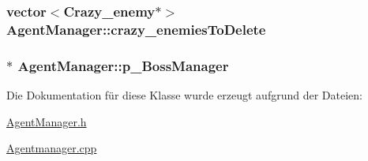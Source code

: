 \hypertarget{class_agent_manager_ad04668952fb54954caf87f088eedf4ca}{
\subsubsection[{crazy\-\_\-enemies\-To\-Delete}]{\setlength{\rightskip}{0pt plus 5cm}vector$<${\bf Crazy\-\_\-enemy}$\ast$$>$ Agent\-Manager\-::crazy\-\_\-enemies\-To\-Delete\hspace{0.3cm}{\ttfamily [private]}}}\label{class_agent_manager_ad04668952fb54954caf87f088eedf4ca}
\hypertarget{class_agent_manager_a44183c7f9aa95bfdfab8e2c075d530a3}{
\subsubsection[{p\-\_\-\-Boss\-Manager}]{$\ast$ Agent\-Manager\-::p\-\_\-\-Boss\-Manager\hspace{0.3cm}{\ttfamily [private]}}}\label{class_agent_manager_a44183c7f9aa95bfdfab8e2c075d530a3}


Die Dokumentation für diese Klasse wurde erzeugt aufgrund der Dateien\-:\begin{DoxyCompactItemize}
\item 
\hyperlink{_agent_manager_8h}{Agent\-Manager.\-h}\item 
\hyperlink{_agentmanager_8cpp}{Agentmanager.\-cpp}\end{DoxyCompactItemize}
